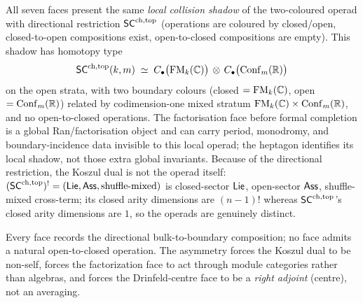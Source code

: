 \begin{convention}\label{conv:heptagon-object}
All seven faces present the same \emph{local collision shadow} of the
two-coloured operad with directional restriction $\mathsf{SC}^{\mathrm{ch},\mathrm{top}}$
(operations are coloured by
closed/open, closed-to-open compositions exist, open-to-closed
compositions are empty). This shadow has homotopy type
\begin{equation}
 \mathsf{SC}^{\mathrm{ch},\mathrm{top}}(k,m)
 \;\simeq\;
 C_{\bullet}\bigl(\mathrm{FM}_k(\mathbb{C})\bigr)
 \,\otimes\,
 C_{\bullet}\bigl(\mathrm{Conf}_m(\mathbb{R})\bigr)
\end{equation}
on the open strata, with two boundary colours
(closed $=\mathrm{FM}_k(\mathbb{C})$, open $=\mathrm{Conf}_m(\mathbb{R})$) related by
codimension-one mixed stratum $\mathrm{FM}_k(\mathbb{C})\times\mathrm{Conf}_m(\mathbb{R})$,
and no open-to-closed operations. The factorisation face before
formal completion is a global Ran/factorisation object and can carry
period, monodromy, and boundary-incidence data invisible to this local
operad; the heptagon identifies its local shadow, not those extra
global invariants. Because of the directional restriction, the Koszul
dual is not the operad itself:
$(\mathsf{SC}^{\mathrm{ch},\mathrm{top}})^{!}=(\mathsf{Lie},\mathsf{Ass},\text{shuffle-mixed})$ is closed-sector
$\mathsf{Lie}$, open-sector $\mathsf{Ass}$, shuffle-mixed cross-term; its closed
arity dimensions are $(n-1)!$ whereas $\mathsf{SC}^{\mathrm{ch},\mathrm{top}}$'s closed arity
dimensions are $1$, so the operads are genuinely distinct.
\end{convention}

\begin{remark}\label{rem:heptagon-asymmetry}
Every face records the directional bulk-to-boundary composition;
no face admits a natural open-to-closed operation. The asymmetry forces
the Koszul dual to be non-self, forces the factorization face to act
through module categories rather than algebras, and forces the
Drinfeld-centre face to be a \emph{right adjoint} (centre), not an
averaging.
\end{remark}

